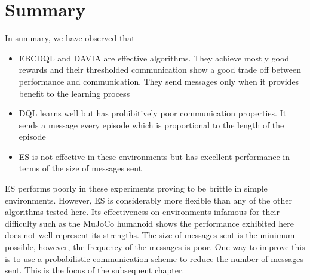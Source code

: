 \section{Summary}
In summary, we have observed that 
\begin{itemize}
    \item EBCDQL and DAVIA are effective algorithms. They achieve mostly good rewards and their thresholded communication show a good trade off between performance and communication. They send messages only when it provides benefit to the learning process
    \item DQL learns well but has prohibitively poor communication properties. It sends a message every episode which is proportional to the length of the episode
    \item ES is not effective in these environments but has excellent performance in terms of the size of messages sent
\end{itemize}

ES performs poorly in these experiments proving to be brittle in simple environments. However, ES is considerably more flexible than any of the other algorithms tested here. Its effectiveness on environments infamous for their difficulty such as the MuJoCo humanoid shows the performance exhibited here does not well represent its strengths. The size of messages sent is the minimum possible, however, the frequency of the messages is poor. One way to improve this is to use a probabilistic communication scheme to reduce the number of messages sent. This is the focus of the subsequent chapter.



